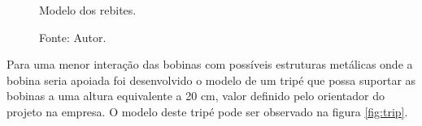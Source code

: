 \begin{figure}[H]
    \centering
     \caption{Modelo dos rebites.}
     \caption*{Fonte: Autor.}\label{fig:reb}
\end{figure}

Para uma menor interação das bobinas com possíveis estruturas metálicas onde a bobina seria apoiada foi desenvolvido o modelo de um tripé que possa suportar as bobinas a uma altura equivalente a 20 cm, valor definido pelo orientador do projeto na empresa. O modelo deste tripé pode ser observado na figura \ref{fig:trip}.

